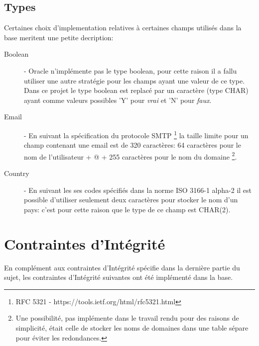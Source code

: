 \documentclass[twoside,openright,a4paper,11pt,french]{article}
\begin{document}
\subsection{Types}
Certaines choix d'implementation relatives à certaines champs utilisés dans la
base meritent une petite decription:


\begin{description}
\item[Boolean] - 
Oracle n'implémente pas le type boolean, pour cette raison il a fallu utiliser
une autre stratégie pour les champs ayant une valeur de ce type.  Dans ce
projet le type boolean est replacé par un caractère (type CHAR) ayant comme
valeurs possibles 'Y' pour {\it vrai} et 'N' pour {\it faux}.

\item[Email] - En suivant la spécification du protocole SMTP
\footnote{RFC 5321 - https://tools.ietf.org/html/rfc5321.html}
la taille limite pour un champ contenant une email est de 320 caractères: 64
caractères pour le nom de l'utilisateur + @ + 255 caractères pour le nom du
domaine \footnote{ Une possibilité, pas implémente dans le travail rendu pour
des raisons de simplicité, était celle de stocker les noms de domaines dans une
table sépare pour éviter les redondances.}.

\item[Country] - En suivant les ses codes spécifiés dans la norme ISO 3166-1
alpha-2 il est possible d'utiliser seulement deux caractères pour stocker le
nom d'un pays: c'est pour cette raison que le type de ce champ est CHAR(2).

\end{description}

\newpage
\section{Contraintes d'Intégrité} En complément aux contraintes d'Intégrité
spécifie dans la dernière partie du sujet, les contraintes d'Intégrité
suivantes ont été implémenté dans la base.
\end{document}
